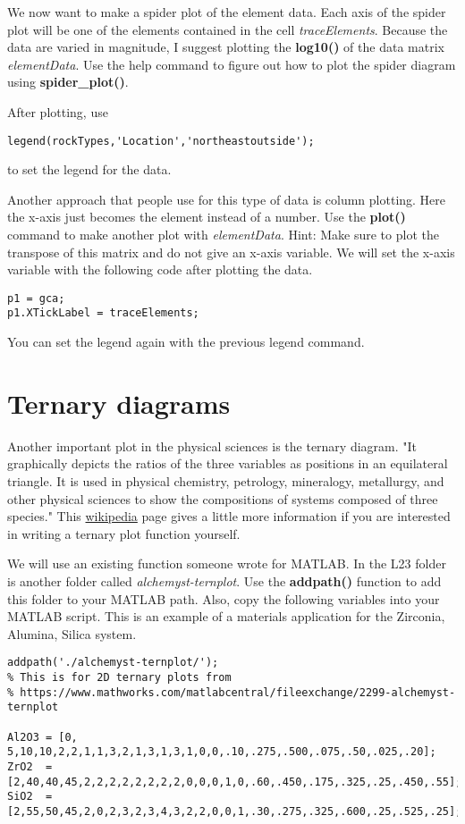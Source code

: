 \documentclass[10pt,fleqn]{article}
\begin{document}
We now want to make a spider plot of the element data. Each axis of the spider plot will be one of the elements contained in the cell \textit{traceElements}. Because the data are varied in magnitude, I suggest plotting the \textbf{log10()} of the data matrix \textit{elementData}. Use the help command to figure out how to plot the spider diagram using \textbf{spider\_plot()}.

After plotting, use 
\begin{lstlisting}
legend(rockTypes,'Location','northeastoutside');
\end{lstlisting}
to set the legend for the data.

Another approach that people use for this type of data is column plotting. Here the x-axis just becomes the element instead of a number. Use the \textbf{plot()} command to make another plot with \textit{elementData}. Hint: Make sure to plot the transpose of this matrix and do not give an x-axis variable. We will set the x-axis variable with the following code after plotting the data.
\begin{lstlisting}
p1 = gca;
p1.XTickLabel = traceElements;
\end{lstlisting}

You can set the legend again with the previous legend command.

\section*{Ternary diagrams}

Another important plot in the physical sciences is the ternary diagram. "It graphically depicts the ratios of the three variables as positions in an equilateral triangle. It is used in physical chemistry, petrology, mineralogy, metallurgy, and other physical sciences to show the compositions of systems composed of three species." This \href{https://en.wikipedia.org/wiki/Ternary_plot}{wikipedia} page gives a little more information if you are interested in writing a ternary plot function yourself.

We will use an existing function someone wrote for MATLAB. In the L23 folder is another folder called \textit{alchemyst-ternplot}. Use the \textbf{addpath()} function to add this folder to your MATLAB path. Also, copy the following variables into your MATLAB script. This is an example of a materials application for the Zirconia, Alumina, Silica system.

\begin{lstlisting}
addpath('./alchemyst-ternplot/');
% This is for 2D ternary plots from 
% https://www.mathworks.com/matlabcentral/fileexchange/2299-alchemyst-ternplot

Al2O3 = [0, 5,10,10,2,2,1,1,3,2,1,3,1,3,1,0,0,.10,.275,.500,.075,.50,.025,.20];
ZrO2  = [2,40,40,45,2,2,2,2,2,2,2,2,0,0,0,1,0,.60,.450,.175,.325,.25,.450,.55];
SiO2  = [2,55,50,45,2,0,2,3,2,3,4,3,2,2,0,0,1,.30,.275,.325,.600,.25,.525,.25];
\end{lstlisting}
\end{document}

